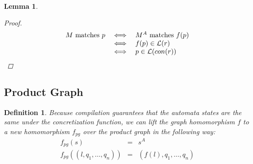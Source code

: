 \documentclass[twocolumn]{sig-alternate-10pt}
\newtheorem{defn}{Definition}
\newtheorem{lem}[thm]{Lemma}
\begin{document}
\begin{lem}
\begin{proof}
    \[ \begin{array}{lll}
      M ~\text{matches}~ p &\iff& M^A ~\text{matches}~ f(p) \\
                         &\iff& f(p) \in \mathcal{L}(r) \\
                         &\iff& p \in \mathcal{L}(con(r)) \\
    \end{array} \]%

  \end{proof}

\end{lem}



\subsection{Product Graph}

\begin{defn}
  Because compilation guarantees that the automata states are the same under the concretization function, we can lift the graph homomorphism $f$ to a new homomorphism $f_{pg}$ over the product graph in the following way:
  \[ \begin{array}{rcl}
    f_{pg}( s ) & = & s^A  \\
    f_{pg}( (l,q_1,\ldots,q_n) ) & = & (f(l),q_1,\ldots,q_n) \\
  \end{array} \]
\end{defn}
\end{document}
